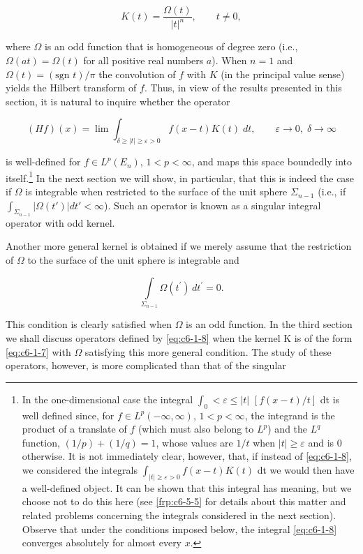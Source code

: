 \begin{equation}\label{eq:c6-1-7}
K(t)=\frac{\Omega(t)}{|t|^{n}},\qquad t\neq0,
\end{equation}

where $\Omega$ is an odd function that is homogeneous of degree zero (i.e., $\Omega(at) = \Omega(t)$ for all positive real numbers $a$). When $n = 1$ and $\Omega(t) = (\text{sgn } t)/\pi$ the convolution of $f$ with $K$ (in the principal value sense) yields the Hilbert transform of $f$. Thus, in view of the results presented in this section, it is natural to inquire whether the operator

\begin{equation}\label{eq:c6-1-8}
(H f)(x)=\lim\int_{\delta\geq|t|\geq\varepsilon>0}f(x-t)K(t)\;{d}t,\qquad\varepsilon\to0,\;\delta\to\infty
\end{equation}

is well-defined for $f\in L^p(E_n)$, $1<p<\infty$, and maps this space boundedly into itself.\footnote{In the one-dimensional case the integral $\int_0 < \varepsilon \leq |t|$ $[f(x - t)/t]$ dt is well defined since, for $f \in L^p(-\infty, \infty)$, $1 < p < \infty$, the integrand is the product of a translate of $f$ (which must also belong to $L^p$) and the $L^q$ function, $(1/p) + (1/q) = 1$, whose values are $1/t$ when $|t| \geq \varepsilon$ and is 0 otherwise. It is not immediately clear, however, that, if instead of \eqref{eq:c6-1-8}, we considered the integrals $\int_{|t| \geq \varepsilon > 0} f(x - t)K(t)$ dt we would then have a well-defined object. It can be shown that this integral has meaning, but we choose not to do this here (see \eqref{frp:c6-5-5} for details about this matter and related problems concerning the integrals considered in the next section). Observe that under the conditions imposed below, the integral \eqref{eq:c6-1-8} converges absolutely for almost every $x$.} In the next section we will show, in particular, that this is indeed the case if $\Omega$ is integrable when restricted to the surface of the unit sphere $\Sigma_{n-1}$ (i.e., if $\int_{\Sigma_{n-1}}|\Omega(t')|dt'<\infty$). Such an operator is known as a singular integral operator with odd kernel.

Another more general kernel is obtained if we merely assume that the restriction of $\Omega$ to the surface of the unit sphere is integrable and

\[
\int\limits_{\Sigma_{n-1}}\Omega(t^{\prime})\,dt^{\prime}=0.
\]

This condition is clearly satisfied when $\Omega$ is an odd function. In the third section we shall discuss operators defined by \eqref{eq:c6-1-8} when the kernel K is of the form \eqref{eq:c6-1-7} with $\Omega$ satisfying this more general condition. The study of these operators, however, is more complicated than that of the singular

